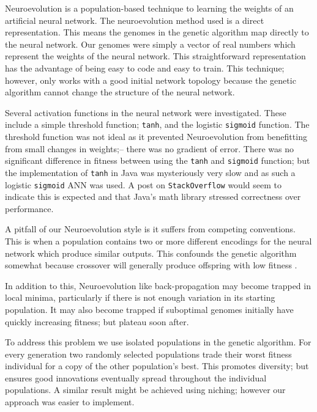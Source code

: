 Neuroevolution is a population-based technique to learning the weights of an artificial neural network.  The neuroevolution method used is a direct representation. This means the genomes in the genetic algorithm map directly to the neural network. Our genomes were simply a vector of real numbers which represent the weights of the neural network. This straightforward representation has the advantage of being easy to code and easy to train. This technique; however, only works with a good initial network topology because the genetic algorithm cannot change the structure of the neural network.

Several activation functions in the neural network were investigated. These include a simple threshold function; \texttt{tanh}, and the logistic \texttt{sigmoid} function. The threshold function was not ideal as it prevented Neuroevolution from benefitting from small changes in weights;-- there was no gradient of error. There was no significant difference in fitness between using the \texttt{tanh} and \texttt{sigmoid} function; but the implementation of \texttt{tanh} in Java was mysteriously very slow and as such a logistic \texttt{sigmoid} ANN was used. A post on \texttt{StackOverflow} \cite{slowtanh} would seem to indicate this is expected and that Java's math library stressed correctness over performance.

A pitfall of our Neuroevolution style is it suffers from competing conventions. This is when a population contains two or more different encodings for the neural network which produce similar outputs. This confounds the genetic algorithm somewhat because crossover will generally produce offspring with low fitness \cite{mattiussi2011beyond}.

In addition to this, Neuroevolution like back-propagation may become trapped in local minima, particularly if there is not enough variation in its starting population. It may also become trapped if suboptimal genomes initially have quickly increasing fitness; but plateau soon after.

To address this problem we use isolated populations in the genetic algorithm. For every generation two randomly selected populations trade their worst fitness individual for a copy of the other population's best. This promotes diversity; but ensures good innovations eventually spread throughout the individual populations. A similar result might be achieved using niching; however our approach was easier to implement.


